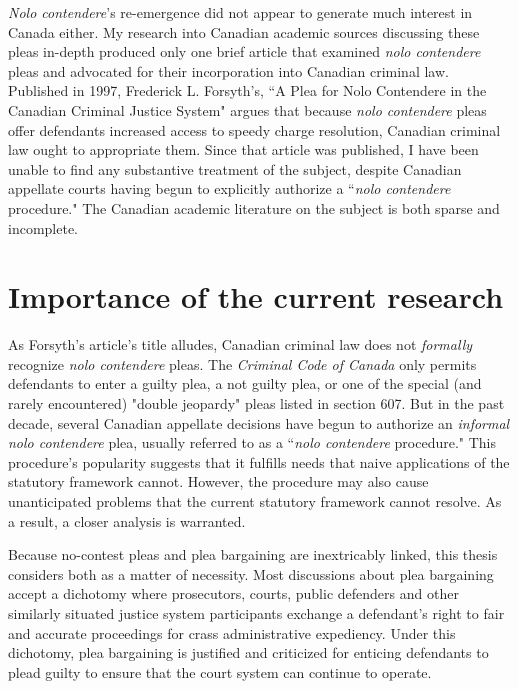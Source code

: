 \textit{Nolo contendere}'s re-emergence did not appear to generate much interest in Canada either. My research into Canadian academic sources discussing these pleas in-depth produced only one brief article that examined \textit{nolo contendere} pleas and advocated for their incorporation into Canadian criminal law. Published in 1997, Frederick L. Forsyth's, ``A Plea for Nolo Contendere in the Canadian Criminal Justice System" argues that because \textit{nolo contendere} pleas offer defendants increased access to speedy charge resolution, Canadian criminal law ought to appropriate them. Since that article was published, I have been unable to find any substantive treatment of the subject, despite Canadian appellate courts having begun to explicitly authorize a ``\textit{nolo contendere} procedure." The Canadian academic literature on the subject is both sparse and incomplete.

\section{Importance of the current research}

As Forsyth's article's title alludes, Canadian criminal law does not \textit{formally} recognize \textit{nolo contendere} pleas. The \textit{Criminal Code of Canada} only permits defendants to enter a guilty plea, a not guilty plea, or one of the special (and rarely encountered) "double jeopardy" pleas listed in section 607. But in the past decade, several Canadian appellate decisions have begun to authorize an \textit{informal} \textit{nolo contendere} plea, usually referred to as a ``\textit{nolo contendere} procedure." This procedure's popularity suggests that it fulfills needs that naive applications of the statutory framework cannot. However, the procedure may also cause unanticipated problems that the current statutory framework cannot resolve. As a result, a closer analysis is warranted.

Because no-contest pleas and plea bargaining are inextricably linked, this thesis considers both as a matter of necessity. Most discussions about plea bargaining accept a dichotomy where prosecutors, courts, public defenders and other similarly situated justice system participants exchange a defendant's right to fair and accurate proceedings for crass administrative expediency. Under this dichotomy, plea bargaining is justified and criticized for enticing defendants to plead guilty to ensure that the court system can continue to operate.

